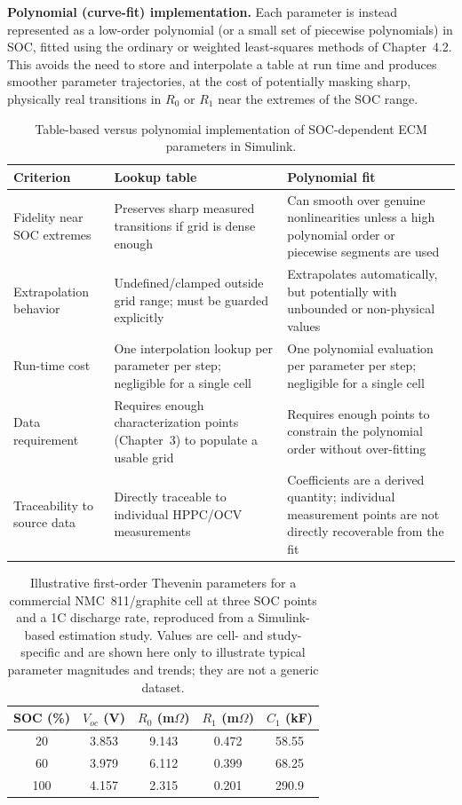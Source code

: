 \textbf{Polynomial (curve-fit) implementation.} Each parameter is
instead represented as a low-order polynomial (or a small set of
piecewise polynomials) in SOC, fitted using the ordinary or weighted
least-squares methods of Chapter~4.2. This avoids the need to store
and interpolate a table at run time and produces smoother parameter
trajectories, at the cost of potentially masking sharp, physically
real transitions in $R_0$ or $R_1$ near the extremes of the SOC range.

\begin{table}[htbp]
\centering
\caption{Table-based versus polynomial implementation of SOC-dependent ECM parameters in Simulink.}
\label{tab:10_lookup_vs_poly}
\begin{tabular}{p{2.8cm}p{4.7cm}p{4.7cm}}
\toprule
\textbf{Criterion} & \textbf{Lookup table} & \textbf{Polynomial fit} \\
\midrule
Fidelity near SOC extremes & Preserves sharp measured transitions if grid is dense enough & Can smooth over genuine nonlinearities unless a high polynomial order or piecewise segments are used \\
Extrapolation behavior & Undefined/clamped outside grid range; must be guarded explicitly & Extrapolates automatically, but potentially with unbounded or non-physical values \\
Run-time cost & One interpolation lookup per parameter per step; negligible for a single cell & One polynomial evaluation per parameter per step; negligible for a single cell \\
Data requirement & Requires enough characterization points (Chapter~3) to populate a usable grid & Requires enough points to constrain the polynomial order without over-fitting \\
Traceability to source data & Directly traceable to individual HPPC/OCV measurements & Coefficients are a derived quantity; individual measurement points are not directly recoverable from the fit \\
\bottomrule
\end{tabular}
\end{table}

\begin{table}[htbp]
\centering
\caption{Illustrative first-order Thevenin parameters for a commercial NMC~811/graphite cell at three SOC points and a 1C discharge rate, reproduced from a Simulink-based estimation study. Values are cell- and study-specific and are shown here only to illustrate typical parameter magnitudes and trends; they are not a generic dataset. \cite{barletta2022}}
\label{tab:10_barletta}
\begin{tabular}{ccccc}
\toprule
SOC (\%) & $V_{oc}$ (V) & $R_0$ (m$\Omega$) & $R_1$ (m$\Omega$) & $C_1$ (kF) \\
\midrule
20  & 3.853 & 9.143 & 0.472 & 58.55 \\
60  & 3.979 & 6.112 & 0.399 & 68.25 \\
100 & 4.157 & 2.315 & 0.201 & 290.9 \\
\bottomrule
\end{tabular}
\end{table}

